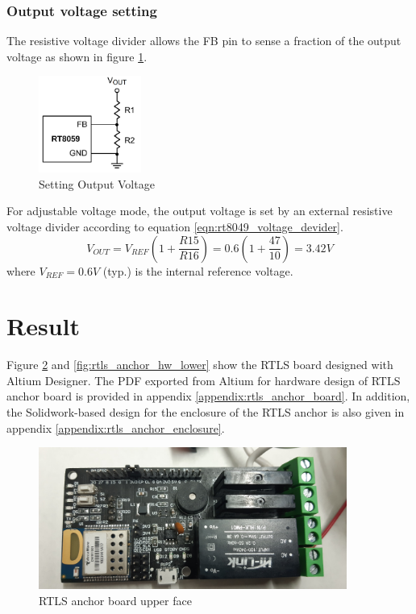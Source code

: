 \documentclass[\main/main.tex]{subfiles}
\begin{document}
\subsubsection{Output voltage setting}
The resistive voltage divider allows the FB pin to sense a fraction of the output voltage as shown in figure \ref{fig:rt8049_setting_output_voltage}.
\begin{figure}[H]
    \begin{center}
        \includegraphics[width=0.3\textwidth]{rt8049_setting_output_voltage.png}
    \end{center}
    \caption{Setting Output Voltage}
    \label{fig:rt8049_setting_output_voltage}
\end{figure}

For adjustable voltage mode, the output voltage is set by an external resistive voltage divider according to equation \ref{eqn:rt8049_voltage_devider}.
\begin{equation}
    V_{OUT} = V_{REF} (1 + \frac{R15}{R16}) = 0.6 (1 + \frac{47}{10}) = 3.42V
    \label{eqn:rt8049_voltage_devider}
\end{equation}
where $V_{REF} = 0.6V$ (typ.) is the internal reference voltage.

\section{Result}
Figure \ref{fig:rtls_anchor_hw_upper} and \ref{fig:rtls_anchor_hw_lower} show the RTLS board designed with Altium Designer. The PDF exported from Altium for hardware design of RTLS anchor board is provided in appendix \ref{appendix:rtls_anchor_board}. In addition, the Solidwork-based design for the enclosure of the RTLS anchor is also given in appendix \ref{appendix:rtls_anchor_enclosure}.
\begin{figure}[H]
    \begin{center}
        \includegraphics[width=0.9\textwidth]{rtls_anchor_hw_upper.jpg}
    \end{center}
    \caption{RTLS anchor board upper face}
    \label{fig:rtls_anchor_hw_upper}
\end{figure}
\end{document}
